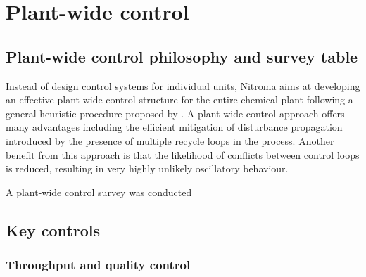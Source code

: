 \section{Plant-wide control}

\subsection{Plant-wide control philosophy and survey table}%

Instead of design control systems for individual units, Nitroma aims at developing an effective plant-wide control structure for the entire chemical plant following a general heuristic procedure proposed by \textcite{}. A plant-wide control approach offers many advantages including the efficient mitigation of disturbance propagation introduced by the presence of multiple recycle loops in the process. Another benefit from this approach is that the likelihood of conflicts between control loops is reduced, resulting in very highly unlikely  oscillatory behaviour. 

A plant-wide control survey was conducted 










\subsection{Key controls}

\subsubsection{Throughput and quality control}


